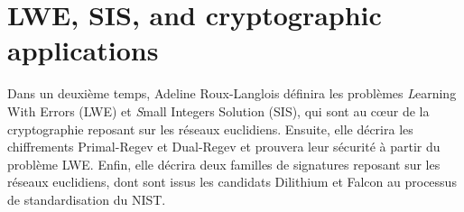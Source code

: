 \section{LWE, SIS, and cryptographic applications}
\label{se:LBC}

Dans un deuxième temps, Adeline Roux-Langlois définira les problèmes
{\emph Learning With Errors} (LWE)
et {\emph Small Integers Solution} (SIS), qui sont au c{\oe}ur de la
cryptographie
reposant sur les réseaux euclidiens. Ensuite, elle décrira les chiffrements
Primal-Regev et Dual-Regev et prouvera leur sécurité à partir du
problème LWE. Enfin, elle décrira deux familles de signatures reposant
sur les réseaux euclidiens, dont sont issus les candidats Dilithium et Falcon
au processus de standardisation du NIST.